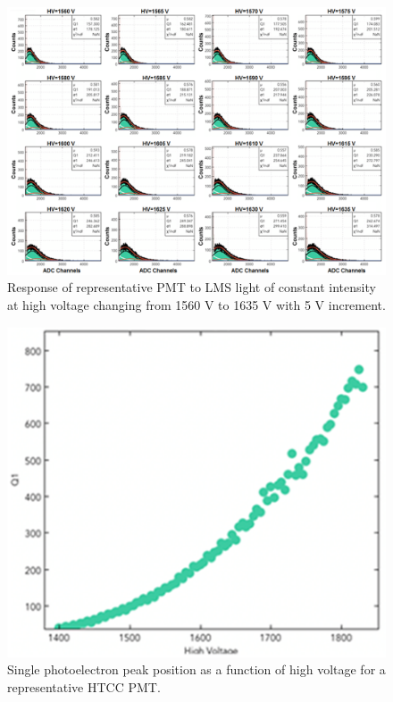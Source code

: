 \begin{figure}[ht]
\centering
\includegraphics[width=0.99\linewidth]{images/WILLIAM_2_NEW.png}
\caption{Response of representative PMT to LMS light of constant intensity at high voltage changing from 1560 V to 1635 V with 5 V increment.}
\label{fig:WILLIAM_2_NEW}
\end{figure}

\begin{figure}[ht]
\centering
\includegraphics[width=0.99\linewidth]{images/WILLIAM_3_NEW.png}
\caption{Single photoelectron peak position as a function of high voltage for a representative HTCC PMT.}
\label{fig:WILLIAM_3_NEW}
\end{figure}

